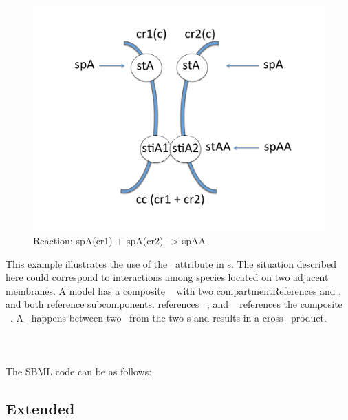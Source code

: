 \begin{figure}[htb]
  \includegraphics[scale=0.25]{./figs/example_extendedSimpleSpeciesReference_ppt}
  \caption{Reaction: spA(cr1) + spA(cr2) --> spAA}
  \label{fig:Example:extendedSimpleSpeciesReference}
\end{figure}

This example illustrates the use of the \compartmentReferenceAtt\ attribute in \simpleSpeciesReference s. The situation described here could correspond to interactions among species located on two adjacent membranes. A model has a composite \compartment\  with two compartmentReferences  and , and both reference  subcomponents.   references \compartment\ , and \species\  references the composite \compartment\ . A \reaction\ happens between two  \species\ from the two  \compartment s and results in a cross-\compartment\ product. 
\\
\\
\\
\\
The SBML code can be as follows:

\clearpage

\subsection{Extended }
\label{def:ExSpeciesReference}

